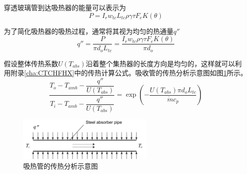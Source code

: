 穿透玻璃管到达吸热器的能量可以表示为
\begin{equation}
  P = I_r w_{tc} L_{tc} \rho \gamma \tau F_e K(\theta)
\end{equation}

为了简化吸热器的吸热过程，通常将其视为均匀的热通量$q''$
\begin{equation}
  q''= \frac{P}{\pi d_o L_{tc}} = \frac{I_r w_{tc} \rho \gamma \tau F_e K(\theta)}{\pi d_o}
\end{equation}


假设整体传热系数$U(T_{abs})$沿着整个集热器的长度方向是均匀的，这样就可以利用附录\ref{cha:CTCHFHX}中的传热计算公式。吸收管的传热分析示意图如图\ref{fig:Pipe}所示。
\begin{equation}
	\frac{T_{o}-T_{amb}-\dfrac{q''}{U(T_{abs})}}{T_{i}-T_{amb}-\dfrac{q''}{U(T_{abs})}}=\exp(-\frac{U(T_{abs})\pi d_o L_{tc}}{\dot{m}c_{p}})\label{eq:CTCHF}
\end{equation}

\begin{figure}[!ht]
\centering
\includegraphics[width=0.6\textwidth]{fig/Pipe.pdf}
\caption{吸热管的传热分析示意图}\label{fig:Pipe}
\end{figure}

